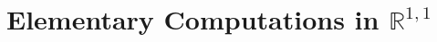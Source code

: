 \documentclass[12pt]{article}
\newcommand{\bC}{\mathbb{C}}
\newcommand{\bR}{\mathbb{R}}
\begin{document}


\section{Elementary Computations in ${\bR}^{1,1}$}\label{compute}
\end{document}
